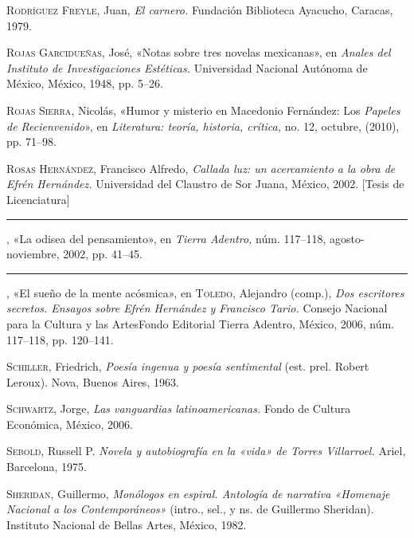 \documentclass[14pt,twoside,final]{extbook} %
\begin{document}
\textsc{Rodríguez Freyle}, Juan, \emph{El carnero.} Fundación Biblioteca Ayacucho, Caracas, 1979.\label{bib:rodriguez1979}

\textsc{Rojas Garcidueñas}, José, «Notas sobre tres novelas mexicanas», en \emph{Anales del Instituto de Investigaciones Estéticas.} Universidad Nacional Autónoma de México, México, 1948, pp. 5--26.\label{bib:rojas1948}

\textsc{Rojas Sierra}, Nicolás, «Humor y misterio en Macedonio Fernández: Los \emph{Papeles de Recienvenido}», en \emph{Literatura: teoría, historia, crítica,} no. 12, octubre, (2010), pp. 71--98.\label{bib:rojas2010}

\textsc{Rosas Hernández}, Francisco Alfredo, \emph{Callada luz: un acercamiento a la obra de Efrén Hernández.} Universidad del Claustro de Sor Juana, México, 2002. [Tesis de Licenciatura]\label{bib:rosas2002a}

\rule{1cm}{0.4pt}, «La odisea del pensamiento», en \emph{Tierra Adentro,} núm. 117--118, agosto-noviembre, 2002, pp. 41--45.\label{bib:rosas2002b}

\rule{1cm}{0.4pt}, «El sueño de la mente acósmica», en \textsc{Toledo}, Alejandro (comp.), \emph{Dos escritores secretos. Ensayos sobre Efrén Hernández y Francisco Tario.} Consejo Nacional para la Cultura y las Artes Fondo Editorial Tierra Adentro, México, 2006, núm. 117--118, pp. 120--141.\label{bib:rosas2006}

\textsc{Schiller}, Friedrich, \emph{Poesía ingenua y poesía sentimental} (est. prel. Robert Leroux). Nova, Buenos Aires, 1963.\label{bib:schiller1963}

\textsc{Schwartz}, Jorge, \emph{Las vanguardias latinoamericanas.} Fondo de Cultura Económica, México, 2006.\label{bib:schwartz2006}

\textsc{Sebold}, Russell P. \emph{Novela y autobiografía en la «vida» de Torres Villarroel.} Ariel, Barcelona, 1975.\label{bib:sebold1975}

\textsc{Sheridan}, Guillermo, \emph{Monólogos en espiral. Antología de narrativa «Homenaje Nacional a los \emph{Contemporáneos}»} (intro., sel., y ns. de Guillermo Sheridan). Instituto Nacional de Bellas Artes, México, 1982.\label{bib:sheridan1982}
\end{document}
